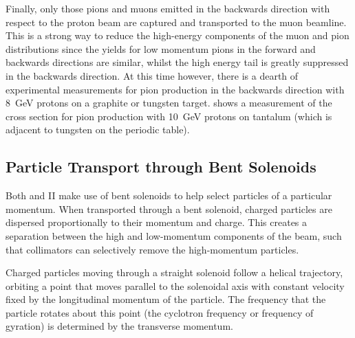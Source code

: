 Finally, only those pions and muons emitted in the backwards direction with respect to the proton beam are captured and transported to the muon beamline.
This is a strong way to reduce the high-energy components of the muon and pion distributions since the yields for low momentum pions in the forward and backwards directions are similar, whilst the high energy tail is greatly suppressed in the backwards direction.
At this time however, there is a dearth of experimental measurements for pion production in the backwards direction with 8~GeV protons on a graphite or tungsten target.
 shows a measurement of the cross section for pion production with 10~GeV protons on tantalum (which is adjacent to tungsten on the periodic table).

\subsection{Particle Transport through Bent Solenoids}
Both \phaseI and II make use of bent solenoids to help select particles of a particular momentum.
When transported through a bent solenoid, charged particles are dispersed proportionally to their momentum and charge.
This creates a separation between the high and low-momentum components of the beam, such that collimators can selectively remove the high-momentum particles.

Charged particles moving through a straight solenoid follow a helical
trajectory, orbiting a point that moves parallel to the solenoidal axis with constant velocity fixed by the longitudinal momentum of the particle.
The frequency that the particle rotates about this point (the cyclotron frequency or frequency of gyration) is determined by the transverse momentum.
\FigBentSolenoidRelativeDrift

